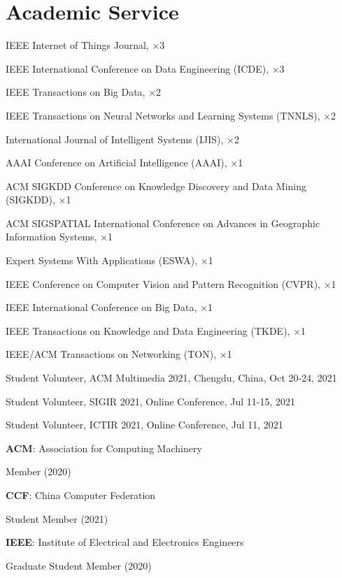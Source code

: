 \section*{Academic Service}


\indent

IEEE Internet of Things Journal, $\times$3

IEEE International Conference on Data Engineering (ICDE), $\times$3

IEEE Transactions on Big Data, $\times$2

IEEE Transactions on Neural Networks and Learning Systems (TNNLS), $\times$2

International Journal of Intelligent Systems (IJIS), $\times$2

AAAI Conference on Artificial Intelligence (AAAI), $\times$1

ACM SIGKDD Conference on Knowledge Discovery and Data Mining (SIGKDD), $\times$1

ACM SIGSPATIAL International Conference on Advances in Geographic Information Systems, $\times$1

Expert Systems With Applications (ESWA), $\times$1

IEEE Conference on Computer Vision and Pattern Recognition (CVPR), $\times$1

IEEE International Conference on Big Data, $\times$1

IEEE Transactions on Knowledge and Data Engineering (TKDE), $\times$1

IEEE/ACM Transactions on Networking (TON), $\times$1

\indent 

Student Volunteer, ACM Multimedia 2021, Chengdu, China, Oct 20-24, 2021

Student Volunteer, SIGIR 2021, Online Conference, Jul 11-15, 2021

Student Volunteer, ICTIR 2021, Online Conference, Jul 11, 2021

\indent 

\textbf{ACM}: Association for Computing Machinery 

\hspace{2em}Member (2020)

\textbf{CCF}: China Computer Federation

\hspace{2em}Student Member (2021)

\textbf{IEEE}: Institute of Electrical and Electronics Engineers

\hspace{2em}Graduate Student Member (2020)